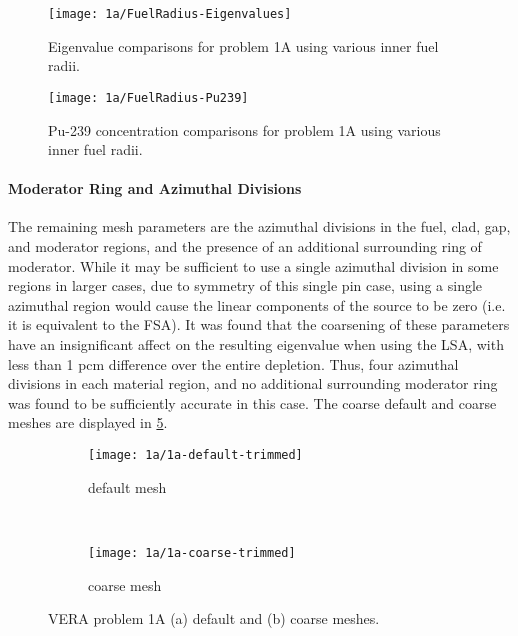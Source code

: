 {{{{        \begin{figure}
            \centering
            \texttt{[image: 1a/FuelRadius-Eigenvalues]}
            \caption{Eigenvalue comparisons for problem 1A using various inner fuel radii. \label{fig:LSMOC:1a:FuelRadius:Eigenvalue}}
        \end{figure}
        \begin{figure}
          \centering
          \texttt{[image: 1a/FuelRadius-Pu239]}
          \caption{Pu-239 concentration comparisons for problem 1A using various inner fuel radii. \label{fig:LSMOC:1a:FuelRadius:Pu239}}
        \end{figure}
      }
      \paragraph{Moderator Ring and Azimuthal Divisions} {
        The remaining mesh parameters are the azimuthal divisions in the fuel, clad, gap, and moderator regions, and the presence of an additional surrounding ring of moderator.
        While it may be sufficient to use a single azimuthal division in some regions in larger cases, due to symmetry of this single pin case, using a single azimuthal region would cause the linear components of the source to be zero (i.e. it is equivalent to the \ac{FSA}).
        It was found that the coarsening of these parameters have an insignificant affect on the resulting eigenvalue when using the \ac{LSA}, with less than 1 \ac{pcm} difference over the entire depletion.
        Thus, four azimuthal divisions in each material region, and no additional surrounding moderator ring was found to be sufficiently accurate in this case.
      }
      The coarse default and coarse meshes are displayed in \cref{figs:LSMOC:1A:Mesh}.

      \begin{figure}[h]
          \centering
          \begin{subfigure}[t]{0.45\textwidth}
              \centering
              \texttt{[image: 1a/1a-default-trimmed]}
              \caption{default mesh\label{fig:LSMOC:1a:Default Mesh}}
          \end{subfigure}%
          ~
          \begin{subfigure}[t]{0.45\textwidth}
              \centering
              \texttt{[image: 1a/1a-coarse-trimmed]}
              \caption{coarse mesh\label{fig:LSMOC:1a:Coarse Mesh}}
          \end{subfigure}
          \caption{VERA problem 1A (a) default and (b) coarse meshes.\label{figs:LSMOC:1A:Mesh}}
      \end{figure}
    }

}}
